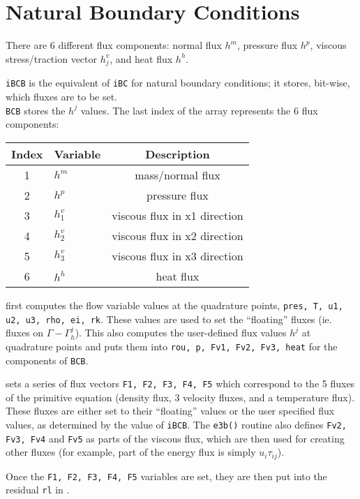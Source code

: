 \documentclass[12pt, letterpaper, twoside]{article}
\newcommand{\ttt}[1]{\texttt{#1}}
\newcommand{\0}{\vec{0}}
\begin{document}
\section{Natural Boundary Conditions}

There are 6 different flux components: normal flux \(h^m\), pressure flux \(h^p\), viscous stress/traction vector \(h^v_j\), and heat flux \(h^h\).

\ttt{iBCB} is the equivalent of \ttt{iBC} for natural boundary conditions; it stores, bit-wise, which fluxes are to be set. \\
\ttt{BCB} stores the \(h^j\) values. The last index of the array represents the 6 flux components:

\begin{tabular} { |c|l|c|}
    \hline
    Index & Variable & Description \\
    \hline
    1 & \(h^m\) & mass/normal flux \\
    2 & \(h^p\) & pressure flux \\
    3 & \(h^v_1\) & viscous flux in x1 direction\\
    4 & \(h^v_2\) & viscous flux in x2 direction\\
    5 & \(h^v_3\) & viscous flux in x3 direction\\
    6 & \(h^h\) & heat flux \\
    \hline

\end{tabular}

 first computes the flow variable values at the quadrature points, \ttt{pres, T, u1, u2, u3, rho, ei, rk}. These values are used to set the ``floating'' fluxes (ie. fluxes on \(\Gamma-\Gamma_h^j\)). This also computes the user-defined flux values \(h^j\) at quadrature points and puts them into \ttt{rou, p, Fv1, Fv2, Fv3, heat} for the components of \ttt{BCB}. 

 sets a series of flux vectors \ttt{F1, F2, F3, F4, F5} which correspond to the 5 fluxes of the primitive equation (density flux, 3 velocity fluxes, and a temperature flux). These fluxes are either set to their ``floating'' values or the user specified flux values, as determined by the value of \ttt{iBCB}. The \ttt{e3b()} routine also defines \ttt{Fv2, Fv3, Fv4} and \ttt{Fv5} as parts of the viscous flux, which are then used for creating other fluxes (for example, part of the energy flux is simply \(u_i \tau_{ij}\)). 

Once the \ttt{F1, F2, F3, F4, F5} variables are set, they are then put into the residual \ttt{rl} in .
\end{document}
